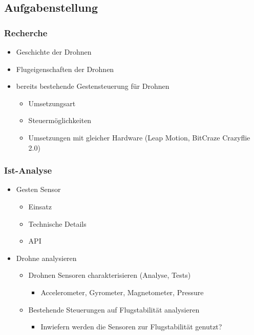 \subsection{Aufgabenstellung}
\subsubsection{Recherche}
\begin{itemize}
	\item Geschichte der Drohnen
	\item Flugeigenschaften der Drohnen
	\item bereits bestehende Gestensteuerung für Drohnen
	\begin{itemize}
		\item Umsetzungsart
		\item Steuermöglichkeiten
		\item Umsetzungen mit gleicher Hardware (Leap Motion, BitCraze Crazyflie 2.0)
	\end{itemize}
\end{itemize}


\subsubsection{Ist-Analyse}
\begin{itemize}
	\item Gesten Sensor
	\begin{itemize}
		\item Einsatz
		\item Technische Details
		\item API
	\end{itemize}
	
	\item Drohne analysieren
	\begin{itemize}
		\item Drohnen Sensoren charakterisieren (Analyse, Tests)
			\begin{itemize}
				\item Accelerometer, Gyrometer, Magnetometer, Pressure
			\end{itemize}
	\end{itemize}
	
	\begin{itemize}
		\item Bestehende Steuerungen auf Flugstabilität analysieren
		\begin{itemize}
			\item Inwiefern werden die Sensoren zur Flugstabilität genutzt?
		\end{itemize}
	\end{itemize}
\end{itemize}


